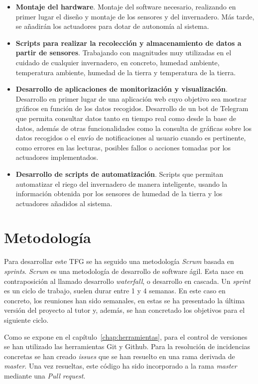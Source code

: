 \documentclass[a4paper, 12pt, oneside]{book}
\begin{document}
\begin{itemize}
\item \textbf{Montaje del hardware}. Montaje del software necesario, realizando en primer lugar el diseño y montaje de los sensores y del invernadero. Más tarde, se añadirán los actuadores para dotar de autonomía al sistema. 

\item \textbf{Scripts para realizar la recolección y almacenamiento de datos a partir de sensores}. Trabajando con magnitudes muy utilizadas en el cuidado de cualquier invernadero, en concreto, humedad ambiente, temperatura ambiente, humedad de la tierra y temperatura de la tierra.

\item \textbf{Desarrollo de aplicaciones de monitorización y visualización}. Desarrollo en primer lugar de una aplicación web cuyo objetivo sea mostrar gráficos en función de los datos recogidos.
Desarrollo de un bot de Telegram que permita consultar datos tanto en tiempo real como desde la base de datos, además de otras funcionalidades como la consulta de gráficas sobre los datos recogidos o el envío de notificaciones al usuario cuando es pertinente, como errores en las lecturas, posibles fallos o acciones tomadas por los actuadores implementados.

\item \textbf{Desarrollo de scripts de automatización}. Scripts que permitan automatizar el riego del invernadero de manera inteligente, usando la información obtenida por los sensores de humedad de la tierra y los actuadores añadidos al sistema. 
\end{itemize}

\section{Metodología}
\label{sec:Metodología}
Para desarrollar este TFG se ha seguido una metodología \textit{Scrum} basada en \textit{sprints}.
\textit{Scrum} es una metodología de desarrollo de software ágil. Esta nace en contraposición al llamado desarrollo \textit{waterfall}, o desarrollo en cascada. Un \textit{sprint} es un ciclo de trabajo, suelen durar entre 1 y 4 semanas.
En este caso en concreto, los reuniones han sido semanales, en estas se ha presentado la última versión del proyecto al tutor y, además, se han concretado los objetivos para el siguiente ciclo.

Como se expone en el capítulo~\ref{chap:herramientas}, para el control de versiones se han utilizado las herramientas Git y Github. Para la resolución de incidencias concretas se han creado \textit{issues} que se han resuelto en una rama derivada de \textit{master}. Una vez resueltas, este código ha sido incorporado a la rama \textit{master} mediante una \textit{Pull request}.
\end{document}
